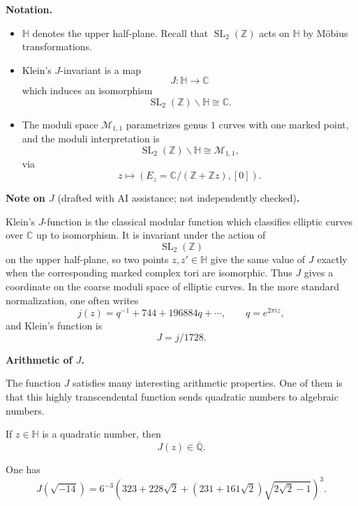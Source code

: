 \medskip\noindent
{\bf Notation.}

\begin{itemize}
\item $\mathbb H$ denotes the upper
half-plane.
Recall that $\operatorname{SL}_2
(\mathbb Z)$ acts on $\mathbb H$ by
M\"obius transformations.
\item Klein's $J$-invariant is a map
\[
        J:\mathbb H\to\mathbb C
\]
which induces an isomorphism
\[
        \operatorname{SL}_2(\mathbb Z)
        \backslash\mathbb H
        \cong
        \mathbb C.
\]
\item The moduli space
$\mathcal M_{1,1}$ parametrizes genus
$1$ curves with one marked point, and
the moduli interpretation is
\[
        \operatorname{SL}_2(\mathbb Z)
        \backslash\mathbb H
        \cong
        \mathcal M_{1,1},
\]
via
\[
        z\longmapsto
        (E_z=\mathbb C/(\mathbb Z
        +\mathbb Zz),[0]).
\]
\end{itemize}

\medskip\noindent
{\bf Note on $J$} (drafted with AI
assistance; not independently checked){\bf .}

Klein's $J$-function is the classical
modular function which classifies
elliptic curves over $\mathbb C$ up
to isomorphism.
It is invariant under the action of
\[
        \operatorname{SL}_2(\mathbb Z)
\]
on the upper half-plane, so two
points $z,z'\in\mathbb H$ give the
same value of $J$ exactly when the
corresponding marked complex tori are
isomorphic.
Thus $J$ gives a coordinate on the
coarse moduli space of elliptic
curves.
In the more standard normalization,
one often writes
\[
        j(z)=q^{-1}+744+196884q+\cdots,
        \qquad
        q=e^{2\pi iz},
\]
and Klein's function is
\[
        J=j/1728.
\]

\medskip\noindent
{\bf Arithmetic of $J$.}

The function $J$ satisfies many
interesting arithmetic properties.
One of them is that this highly
transcendental function sends
quadratic numbers to algebraic
numbers.

\begin{theorem}[Kronecker]
\label{theorem-z-h}
If $z\in\mathbb H$ is a quadratic
number, then
\[
        J(z)\in\overline{\mathbb Q}.
\]
\end{theorem}

\begin{example}[Weber]
\label{example-one-has}
One has
\[
        J(\sqrt{-14})
        =
        6^{-3}
        \left(
        323+228\sqrt 2
        +(231+161\sqrt 2)
        \sqrt{2\sqrt 2-1}
        \right)^3.
\]
\end{example}

